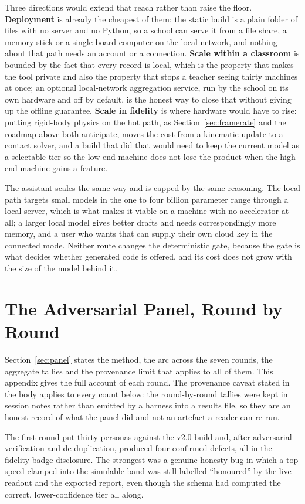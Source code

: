 \documentclass[11pt,a4paper]{report}
\begin{document}
 Three directions would extend that reach rather than raise the floor. \textbf{Deployment} is already the cheapest of them: the static build is a plain folder of files with no server and no Python, so a school can serve it from a file share, a memory stick or a single-board computer on the local network, and nothing about that path needs an account or a connection. \textbf{Scale within a classroom} is bounded by the fact that every record is local, which is the property that makes the tool private and also the property that stops a teacher seeing thirty machines at once; an optional local-network aggregation service, run by the school on its own hardware and off by default, is the honest way to close that without giving up the offline guarantee. \textbf{Scale in fidelity} is where hardware would have to rise: putting rigid-body physics on the hot path, as Section~\ref{sec:framerate} and the roadmap above both anticipate, moves the cost from a kinematic update to a contact solver, and a build that did that would need to keep the current model as a selectable tier so the low-end machine does not lose the product when the high-end machine gains a feature.

The assistant scales the same way and is capped by the same reasoning. The local path targets small models in the one to four billion parameter range through a local server, which is what makes it viable on a machine with no accelerator at all; a larger local model gives better drafts and needs correspondingly more memory, and a user who wants that can supply their own cloud key in the connected mode. Neither route changes the deterministic gate, because the gate is what decides whether generated code is offered, and its cost does not grow with the size of the model behind it.

\chapter{The Adversarial Panel, Round by Round}
\label{app:panel}
Section~\ref{sec:panel} states the method, the arc across the seven rounds, the aggregate tallies and the provenance limit that applies to all of them. This appendix gives the full account of each round. The provenance caveat stated in the body applies to every count below: the round-by-round tallies were kept in session notes rather than emitted by a harness into a results file, so they are an honest record of what the panel did and not an artefact a reader can re-run.

The first round put thirty personas against the v2.0 build and, after adversarial verification and de-duplication, produced four confirmed defects, all in the fidelity-badge disclosure. The strongest was a genuine honesty bug in which a top speed clamped into the simulable band was still labelled ``honoured'' by the live readout and the exported report, even though the schema had computed the correct, lower-confidence tier all along.
\end{document}

